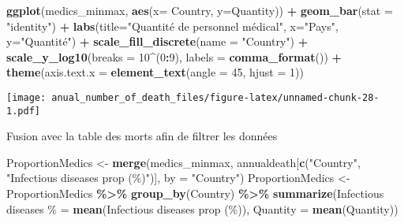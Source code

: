 \documentclass[
]{article}
\newenvironment{Shaded}{\begin{snugshade}}{\end{snugshade}}
\newcommand{\AttributeTok}[1]{\textcolor[rgb]{0.13,0.29,0.53}{#1}}
\newcommand{\DecValTok}[1]{\textcolor[rgb]{0.00,0.00,0.81}{#1}}
\newcommand{\FunctionTok}[1]{\textcolor[rgb]{0.13,0.29,0.53}{\textbf{#1}}}
\newcommand{\NormalTok}[1]{#1}
\newcommand{\OtherTok}[1]{\textcolor[rgb]{0.56,0.35,0.01}{#1}}
\newcommand{\SpecialCharTok}[1]{\textcolor[rgb]{0.81,0.36,0.00}{\textbf{#1}}}
\newcommand{\StringTok}[1]{\textcolor[rgb]{0.31,0.60,0.02}{#1}}
\begin{document}
\begin{Shaded}
\begin{Highlighting}[]
\FunctionTok{ggplot}\NormalTok{(medics\_minmax, }\FunctionTok{aes}\NormalTok{(}\AttributeTok{x=}\NormalTok{ Country, }\AttributeTok{y=}\StringTok{\textasciigrave{}}\AttributeTok{Quantity}\StringTok{\textasciigrave{}}\NormalTok{)) }\SpecialCharTok{+} \FunctionTok{geom\_bar}\NormalTok{(}\AttributeTok{stat =} \StringTok{"identity"}\NormalTok{) }\SpecialCharTok{+} \FunctionTok{labs}\NormalTok{(}\AttributeTok{title=}\StringTok{"Quantité de personnel médical"}\NormalTok{, }\AttributeTok{x=}\StringTok{"Pays"}\NormalTok{, }\AttributeTok{y=}\StringTok{"Quantité"}\NormalTok{) }\SpecialCharTok{+} \FunctionTok{scale\_fill\_discrete}\NormalTok{(}\AttributeTok{name =} \StringTok{"Country"}\NormalTok{) }\SpecialCharTok{+} \FunctionTok{scale\_y\_log10}\NormalTok{(}\AttributeTok{breaks =} \DecValTok{10}\SpecialCharTok{\^{}}\NormalTok{(}\DecValTok{0}\SpecialCharTok{:}\DecValTok{9}\NormalTok{), }\AttributeTok{labels =} \FunctionTok{comma\_format}\NormalTok{()) }\SpecialCharTok{+}
  \FunctionTok{theme}\NormalTok{(}\AttributeTok{axis.text.x =} \FunctionTok{element\_text}\NormalTok{(}\AttributeTok{angle =} \DecValTok{45}\NormalTok{, }\AttributeTok{hjust =} \DecValTok{1}\NormalTok{))}
\end{Highlighting}
\end{Shaded}

\texttt{[image: anual\_number\_of\_death\_files/figure-latex/unnamed-chunk-28-1.pdf]}

Fusion avec la table des morts afin de filtrer les données

\begin{Shaded}
\begin{Highlighting}[]
\NormalTok{ProportionMedics }\OtherTok{\textless{}{-}} \FunctionTok{merge}\NormalTok{(medics\_minmax, annualdeath[}\FunctionTok{c}\NormalTok{(}\StringTok{"Country"}\NormalTok{, }\StringTok{"Infectious diseases prop (\%)"}\NormalTok{)], }\AttributeTok{by =} \StringTok{"Country"}\NormalTok{)}
\NormalTok{ProportionMedics }\OtherTok{\textless{}{-}}\NormalTok{ ProportionMedics }\SpecialCharTok{\%\textgreater{}\%} \FunctionTok{group\_by}\NormalTok{(Country) }\SpecialCharTok{\%\textgreater{}\%} \FunctionTok{summarize}\NormalTok{(}\StringTok{\textasciigrave{}}\AttributeTok{Infectious diseases \%}\StringTok{\textasciigrave{}} \OtherTok{=} \FunctionTok{mean}\NormalTok{(}\StringTok{\textasciigrave{}}\AttributeTok{Infectious diseases prop (\%)}\StringTok{\textasciigrave{}}\NormalTok{), }\StringTok{\textasciigrave{}}\AttributeTok{Quantity}\StringTok{\textasciigrave{}} \OtherTok{=} \FunctionTok{mean}\NormalTok{(}\StringTok{\textasciigrave{}}\AttributeTok{Quantity}\StringTok{\textasciigrave{}}\NormalTok{))}
\end{Highlighting}
\end{Shaded}
\end{document}
